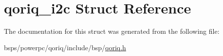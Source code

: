 \hypertarget{structqoriq__i2c}{}\section{qoriq\+\_\+i2c Struct Reference}
\label{structqoriq__i2c}


The documentation for this struct was generated from the following file\+:\begin{DoxyCompactItemize}
\item 
bsps/powerpc/qoriq/include/bsp/\mbox{\hyperlink{qoriq_8h}{qoriq.\+h}}\end{DoxyCompactItemize}

